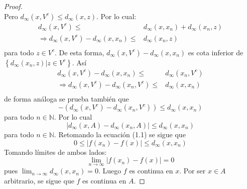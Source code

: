 \documentclass[12pt]{report}
\theoremstyle{largebreak}
\newcommand\abs[1]{\ensuremath{\lvert#1\rvert}}
\begin{document}
\begin{proof}
\begin{equation*}
    \end{equation*}
    Pero $d_{\infty}(x,V^c)\leq d_{\infty}(x,z)$. Por lo cual:
    \begin{equation*}
        \begin{split}
            d_{\infty}(x,V^c)\leq&d_{\infty}(x,x_n)+d_{\infty}(x_n,z)\\
            \Rightarrow d_{\infty}(x,V^c)-d_{\infty}(x,x_n)\leq&d_{\infty}(x_n,z)\\
        \end{split}
    \end{equation*}
    para todo $z\in V^c$. De esta forma, $d_{\infty}(x,V^c)-d_{\infty}(x,x_n)$ es cota inferior de $\left\{d_{\infty}(x_n,z)|z\in V^c\right\}$. Así
    \begin{equation*}
        \begin{split}
            d_{\infty}(x,V^c)-d_{\infty}(x,x_n)\leq&d_{\infty}(x_n,V^c)\\
            \Rightarrow d_{\infty}(x,V^c)-d_{\infty}(x_n,V^c)\leq&d_{\infty}(x,x_n)\\
        \end{split}
    \end{equation*}
    de forma análoga se prueba también que
    \begin{equation*}
        -\left(d_{\infty}(x,V^c)-d_{\infty}(x_n,V^c)\right)\leq d_{\infty}(x,x_n)
    \end{equation*}
    para todo $n\in\mathbb{N}$. Por lo cual
    \begin{equation*}
        \abs{d_{\infty}(x,A)-d_{\infty}(x_n,A)}\leq d_{\infty}(x, x_n)
    \end{equation*}
    para todo $n\in\mathbb{N}$. Retomando la ecuación (1.1) se sigue que
    \begin{equation*}
        0\leq\abs{f(x_n)-f(x)}\leq d_{\infty}(x,x_n)
    \end{equation*}
    Tomando límites de ambos lados:
    \begin{equation*}
        \lim_{n\rightarrow\infty}\abs{f(x_n)-f(x)}=0
    \end{equation*}
    pues $\lim_{n\rightarrow\infty}d_{\infty}(x,x_n)=0$. Luego $f$ es continua en $x$. Por ser $x\in A$ arbitrario, se sigue que $f$ es continua en $A$.


\end{proof}
\end{document}
